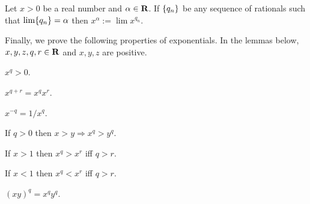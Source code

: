 \begin{defn}\label{c5s7d1}
Let $x > 0$ be a real number and $\alpha \in \mathbf{R}$. If $\{q_n\}$ be
any sequence of rationals such that $\lim\{q_n\} = \alpha$ then $x^\alpha
:= \lim x^{q_n}$.
\end{defn}

Finally, we prove the following properties of exponentials. In the lemmas
below, $x, y, z, q, r \in \mathbf{R}$ and $x, y, z$ are positive.
\begin{lem}\label{c5s7l3}
$x^q > 0$.
\end{lem}

\begin{lem}\label{c5s7l4}
$x^{q+r} = x^q x^r$.
\end{lem}

\begin{lem}\label{c5s7l5}
$x^{-q} = 1/x^q$.
\end{lem}

\begin{lem}\label{c5s7l6}
If $q > 0$ then $x > y \Rightarrow x^q > y^q$.
\end{lem}

\begin{lem}\label{c5s7l7}
If $x > 1$ then $x^q > x^r$ iff $q > r$.
\end{lem}

\begin{lem}\label{c5s7l8}
If $x < 1$ then $x^q < x^r$ iff $q > r$.
\end{lem}

\begin{lem}\label{c5s7l9}
$(xy)^q = x^q y^q$.
\end{lem}


